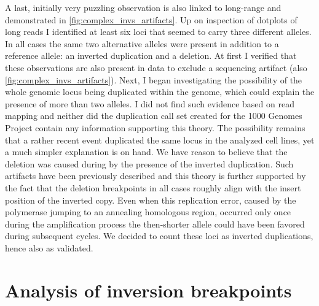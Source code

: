 A last, initially very puzzling observation is also linked to long-range \pcr
and demonstrated in \cref{fig:complex_invs_artifacts}. Up on inspection of
dotplots of long reads I identified at least six loci that seemed to carry three
different alleles. In all cases the same two alternative alleles were present in
addition to a reference allele: an inverted duplication and a deletion. At first
I verified that these observations are also present in \minion data to exclude
a \pacbio sequencing artifact (also \cref{fig:complex_invs_artifacts}).
Next, I began investigating the possibility of the whole genomic locus being
duplicated within the genome, which could explain the presence of more than two
alleles. I did not find such evidence based on read mapping and neither did the
duplication call set created for the 1000 Genomes Project contain any
information supporting this theory. The possibility remains that a rather recent
event duplicated the same locus in the analyzed cell lines, yet a much simpler
explanation is on hand. We have reason to believe that the deletion was caused
during \pcr by the presence of the inverted duplication. Such \pcr artifacts
have been previously described \citep{Ji1994,Hommelsheim2015} and this theory is
further supported by the fact that the deletion breakpoints in all cases roughly
align with the insert position of the inverted copy. Even when this replication
error, caused by the polymerase jumping to an annealing homologous region,
occurred only once during the amplification process the then-shorter allele
could have been favored during subsequent \pcr cycles. We decided to count these
loci as inverted duplications, hence also as validated.






\section{Analysis of inversion breakpoints}
\label{sec:breakpoints}

